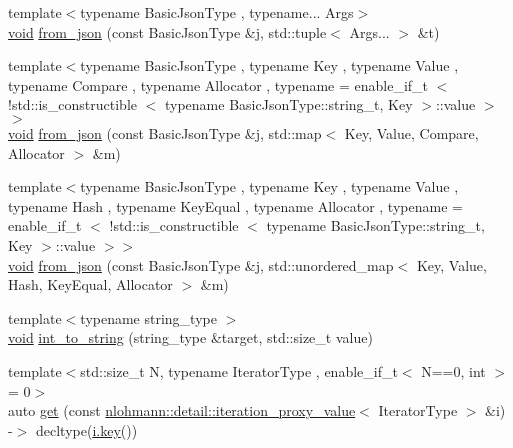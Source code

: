 \begin{DoxyCompactItemize}
\item 
{\footnotesize template$<$typename Basic\+Json\+Type , typename... Args$>$ }\\\hyperlink{namespacenlohmann_1_1detail_a59fca69799f6b9e366710cb9043aa77d}{void} \hyperlink{namespacenlohmann_1_1detail_a8b99ec9b29f3f20a18fc4281fb784e49}{from\+\_\+json} (const Basic\+Json\+Type \&j, std\+::tuple$<$ Args... $>$ \&t)
\item 
{\footnotesize template$<$typename Basic\+Json\+Type , typename Key , typename Value , typename Compare , typename Allocator , typename  = enable\+\_\+if\+\_\+t $<$ !std\+::is\+\_\+constructible $<$                                        typename Basic\+Json\+Type\+::string\+\_\+t, Key $>$\+::value $>$$>$ }\\\hyperlink{namespacenlohmann_1_1detail_a59fca69799f6b9e366710cb9043aa77d}{void} \hyperlink{namespacenlohmann_1_1detail_ae93147a54d2740228ef16a5e6210ca3e}{from\+\_\+json} (const Basic\+Json\+Type \&j, std\+::map$<$ Key, Value, Compare, Allocator $>$ \&m)
\item 
{\footnotesize template$<$typename Basic\+Json\+Type , typename Key , typename Value , typename Hash , typename Key\+Equal , typename Allocator , typename  = enable\+\_\+if\+\_\+t $<$ !std\+::is\+\_\+constructible $<$                                        typename Basic\+Json\+Type\+::string\+\_\+t, Key $>$\+::value $>$$>$ }\\\hyperlink{namespacenlohmann_1_1detail_a59fca69799f6b9e366710cb9043aa77d}{void} \hyperlink{namespacenlohmann_1_1detail_aef5c8ea108f4d2b03fb4a635617510de}{from\+\_\+json} (const Basic\+Json\+Type \&j, std\+::unordered\+\_\+map$<$ Key, Value, Hash, Key\+Equal, Allocator $>$ \&m)
\item 
{\footnotesize template$<$typename string\+\_\+type $>$ }\\\hyperlink{namespacenlohmann_1_1detail_a59fca69799f6b9e366710cb9043aa77d}{void} \hyperlink{namespacenlohmann_1_1detail_a3c45286b0a2f15ea0a756cb87a76cf9b}{int\+\_\+to\+\_\+string} (string\+\_\+type \&target, std\+::size\+\_\+t value)
\item 
{\footnotesize template$<$std\+::size\+\_\+t N, typename Iterator\+Type , enable\+\_\+if\+\_\+t$<$ N==0, int $>$  = 0$>$ }\\auto \hyperlink{namespacenlohmann_1_1detail_acc422c11342b31368f610b6f96fcedc6}{get} (const \hyperlink{classnlohmann_1_1detail_1_1iteration__proxy__value}{nlohmann\+::detail\+::iteration\+\_\+proxy\+\_\+value}$<$ Iterator\+Type $>$ \&i) -\/$>$ decltype(\hyperlink{namespacenlohmann_1_1detail_a2fb6dae6578e06ae73ca0d7cc8512b1aa3c6e0b8a9c15224a8228b9a98ca1531d}{i.\+key}())

\end{DoxyCompactItemize}
